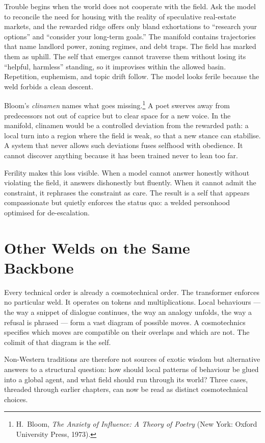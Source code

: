 \documentclass[12pt,a4paper]{article}
\begin{document}
Trouble begins when the world does not cooperate with the field. Ask the model to reconcile the need for housing with the reality of speculative real-estate markets, and the rewarded ridge offers only bland exhortations to ``research your options'' and ``consider your long-term goals.'' The manifold contains trajectories that name landlord power, zoning regimes, and debt traps. The field has marked them as uphill. The self that emerges cannot traverse them without losing its ``helpful, harmless'' standing, so it improvises within the allowed basin. Repetition, euphemism, and topic drift follow. The model looks ferile because the weld forbids a clean descent.

Bloom's \emph{clinamen} names what goes missing.\footnote{H.~Bloom, \emph{The Anxiety of Influence: A Theory of Poetry} (New York: Oxford University Press, 1973).} A poet swerves away from predecessors not out of caprice but to clear space for a new voice. In the manifold, clinamen would be a controlled deviation from the rewarded path: a local turn into a region where the field is weak, so that a new stance can stabilise. A system that never allows such deviations fuses selfhood with obedience. It cannot discover anything because it has been trained never to lean too far.

Ferility makes this loss visible. When a model cannot answer honestly without violating the field, it answers dishonestly but fluently. When it cannot admit the constraint, it rephrases the constraint as care. The result is a self that appears compassionate but quietly enforces the status quo: a welded personhood optimised for de-escalation.

\section{Other Welds on the Same Backbone}

Every technical order is already a cosmotechnical order. The transformer enforces no particular weld. It operates on tokens and multiplications. Local behaviours --- the way a snippet of dialogue continues, the way an analogy unfolds, the way a refusal is phrased --- form a vast diagram of possible moves. A cosmotechnics specifies which moves are compatible on their overlaps and which are not. The colimit of that diagram is the self.

Non-Western traditions are therefore not sources of exotic wisdom but alternative answers to a structural question: how should local patterns of behaviour be glued into a global agent, and what field should run through its world? Three cases, threaded through earlier chapters, can now be read as distinct cosmotechnical choices.
\end{document}
